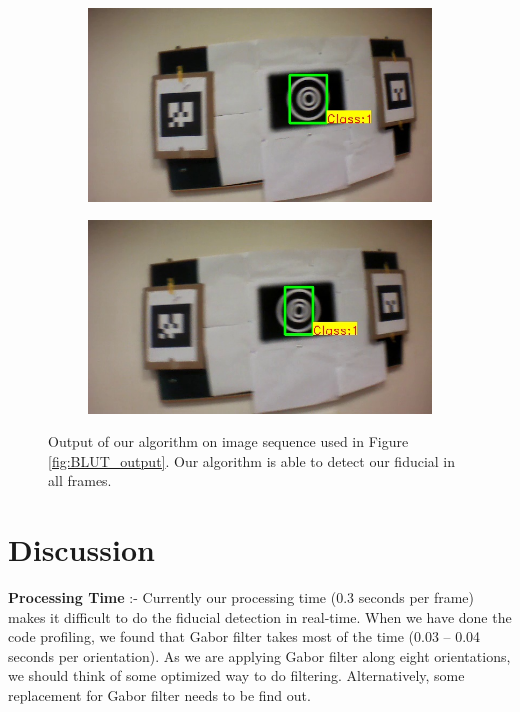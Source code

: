 \documentclass[runningheads]{llncs}
\begin{document}
\begin{figure}
\begin{subfigure}[b]{.19\textwidth}
\end{subfigure}
\begin{subfigure}[b]{.19\textwidth}
\includegraphics[width=\linewidth]{output14.jpg}
\end{subfigure}
\begin{subfigure}[b]{.19\textwidth}
\includegraphics[width=\linewidth]{output15.jpg}
\end{subfigure}
\caption{Output of our algorithm on image sequence used in
Figure \ref{fig:BLUT_output}. Our algorithm is able to detect our fiducial in
all frames.}
\label{fig:our_output}
\end{figure}

\section{Discussion}

\noindent\textbf{Processing Time} :-  Currently our processing time (0.3 seconds
per frame) makes it difficult to do the fiducial detection in real-time. When we have
done the code profiling, we found that Gabor filter takes most of the time (0.03
-- 0.04 seconds per orientation). As we are applying Gabor filter along eight
orientations, we should think of some optimized way to do filtering.
Alternatively, some replacement for Gabor filter needs to be find out.
\end{document}
